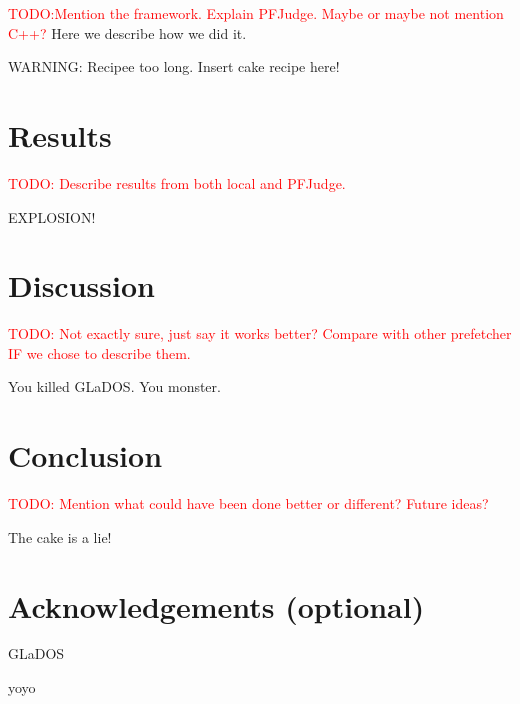 \documentclass[a4paper]{IEEEtran}
\newcommand\TODO[1]{\textcolor{red}{TODO:#1}}
\newcommand\todo[1]{\TODO{#1}}
\begin{document}
\todo{Mention the framework. Explain PFJudge. Maybe or maybe not mention C++?}
Here we describe how we did it.

WARNING: Recipee too long. Insert cake recipe here!

\section{Results}

\todo{ Describe results from both local and PFJudge.}



EXPLOSION!

\section{Discussion}

\todo{ Not exactly sure, just say it works better? Compare with other prefetcher IF we chose to describe them. }

You killed GLaDOS.
You monster.

\section{Conclusion}

\todo{ Mention what could have been done better or different? Future ideas? }

The cake is a lie!

\section{Acknowledgements (optional)}

GLaDOS

yoyo \cite{assignment-text}



\nocite{*}
\end{document}
